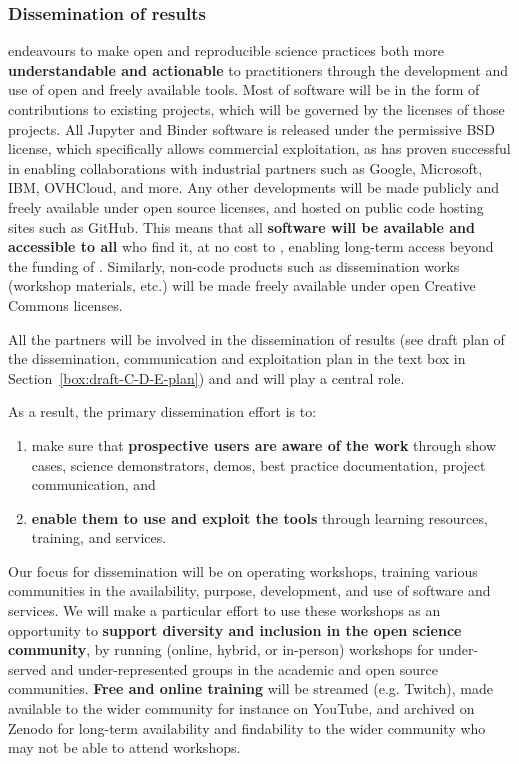 \subsubsection{Dissemination of results}

\TheProject endeavours to make open and reproducible science practices both more \textbf{understandable and actionable}
to practitioners through the development and use of open and freely available tools.
Most of \TheProject software will be in the form of contributions to existing projects,
which will be governed by the licenses of those projects.
All Jupyter and Binder software is released under the permissive BSD license,
which specifically allows commercial exploitation,
as has proven successful in enabling collaborations with industrial partners
such as Google, Microsoft, IBM, OVHCloud, and more.
Any other developments will be made publicly and freely available under open source licenses, and
hosted on public code hosting sites such as GitHub.
This means that all \textbf{\TheProject software will be available and accessible to all} who find it,
at no cost to \TheProject,
enabling long-term access beyond the funding of \TheProject.
Similarly, non-code products such as dissemination works
(workshop materials, etc.) will be made freely available under open Creative Commons licenses.

All the partners will be involved in the dissemination of \TheProject results (see draft plan of the
dissemination, communication and exploitation plan in the text box in Section~\ref{box:draft-C-D-E-plan}) and
 and  will play a central role.

As a result, the primary dissemination effort is to:
\begin{enumerate}
  \item make sure that \textbf{prospective users are aware of the work} through
    {show cases, science demonstrators, demos, best practice
      documentation, project communication}, and
  \item \textbf{enable them to use and exploit the tools} through learning resources, training, and services.
\end{enumerate}

Our focus for dissemination will be on
operating workshops, training various communities in the availability,
purpose, development, and use of \TheProject software and services.
We will make a particular effort to use these workshops as an opportunity
to \textbf{support diversity and inclusion in the open science community},
by running (online, hybrid, or in-person) workshops for under-served and under-represented groups in the academic and
open source communities. \textbf{Free and online training} will be streamed (e.g. Twitch),
made available to the wider community for instance on YouTube, and archived on Zenodo for long-term availability and
findability to the wider community who may not be able to attend workshops.


